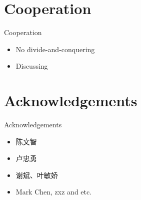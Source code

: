 \documentclass{beamer}
\begin{document}
\part{Cooperation}
\begin{frame}
\partpage
\end{frame}
\begin{frame}{Cooperation}
\begin{itemize}
\item No divide-and-conquering
\item Discussing
\end{itemize}
\end{frame}

\part{Acknowledgements}
\begin{frame}
\partpage
\end{frame}
\begin{frame}{Acknowledgements}
\begin{itemize}
\item
陈文智
\item
卢忠勇
\item
谢斌、叶敏娇
\item
Mark Chen, zxz and etc.
\end{itemize}
\end{frame}


%

\newpage
\end{document}
